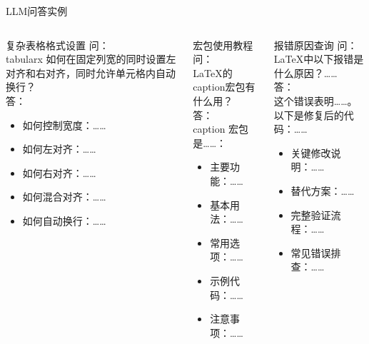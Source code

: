 \begin{frame}[fragile]{LLM问答实例}
  \begin{columns}[c]
		\begin{column}{.33\textwidth}
      \begin{exampleblock}{复杂表格格式设置}
        问：\\\quad tabularx 如何在固定列宽的同时设置左对齐和右对齐，同时允许单元格内自动换行？\\
        答：
        \begin{itemize}
          \item 如何控制宽度：……
          \item 如何左对齐：……
          \item 如何右对齐：……
          \item 如何混合对齐：……
          \item 如何自动换行：……
        \end{itemize}
      \end{exampleblock}
		\end{column}
		\begin{column}{.33\textwidth}
			\begin{exampleblock}{宏包使用教程}
        问：\\\quad LaTeX的caption宏包有什么用？\\
        答：\\\quad caption 宏包是……：
        \begin{itemize}
          \item 主要功能：……
          \item 基本用法：……
          \item 常用选项：……
          \item 示例代码：……
          \item 注意事项：……
        \end{itemize}
      \end{exampleblock}
		\end{column}
    \begin{column}{.33\textwidth}
			\begin{exampleblock}{报错原因查询}
        问：\\\quad LaTeX中以下报错是什么原因？……\\
        答：\\\quad 这个错误表明……。以下是修复后的代码：……\\
        \begin{itemize}
          \item 关键修改说明：……
          \item 替代方案：……
          \item 完整验证流程：……
          \item 常见错误排查：……
        \end{itemize}
      \end{exampleblock}
		\end{column}
	\end{columns}
\end{frame}


